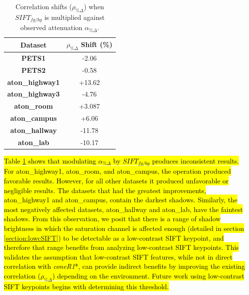 \documentclass[12pt]{report}
\begin{document}
\begin{table}
\centering
\begin{tabular}{ |c|c| }
	\hline
	\textbf{Dataset} & $\rho_{\%\Delta}$ Shift (\%)\\
	\hline
	\hline
	\textbf{PETS1} &  -2.06 \\
	\hline
	\textbf{PETS2} & -0.58 \\
	\hline
	\textbf{aton\_highway1} &  +13.62 \\
	\hline
	\textbf{aton\_highway3} & -4.76  \\
	\hline
	\textbf{aton\_room} & +3.087 \\
	\hline
	\textbf{aton\_campus} & +6.06 \\
	\hline
	\textbf{aton\_hallway} & -11.78 \\
	\hline
	\textbf{aton\_lab} & -10.17 \\
	\hline
\end{tabular}
\caption{Correlation shifts ($\rho_{\%\Delta}$) when $SIFT_{fg/bg}$ is multiplied against observed attenuation $\alpha_{\%\Delta}$.}
\label{table:corr_diff_sift}
\end{table}

\hl{Table \ref{table:corr_diff_sift} shows that modulating $\alpha_{\%\Delta}$ by $SIFT_{fg/bg}$ produces inconsistent results. For aton\_highway1, aton\_room, and aton\_campus, the operation produced favorable results. However, for all other datasets it produced unfavorable or negligible results. The datasets that had the greatest improvements, aton\_highway1 and aton\_campus, contain the darkest shadows. Similarly, the most negatively affected datasets, aton\_hallway and aton\_lab, have the faintest shadows. From this observation, we posit that there is a range of shadow brightness in which the saturation channel is affected enough (detailed in section \ref{section:lowcSIFT}) to be detectable as a low-contrast SIFT keypoint, and therefore that range benefits from analyzing low-contrast SIFT keypoints. This validates the assumption that low-contrast SIFT features, while not in direct correlation with \textit{coneR1}*, can provide indirect benefits by improving the existing correlation ($\rho_{\%\Delta}$) depending on the environment. Future work using low-contrast SIFT keypoints begins with determining this threshold.}

\end{document}
